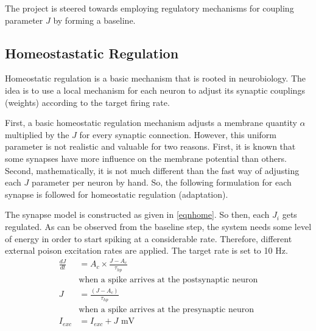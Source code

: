 \documentclass[a4paper,12pt]{article}
\begin{document}
The project is steered towards employing regulatory mechanisms for coupling parameter $J$ by forming a baseline.


\subsection{Homeostastatic Regulation}
Homeostatic regulation is a basic mechanism that is rooted in neurobiology. The idea is to use a local mechanism for each neuron to adjust its synaptic couplings (weights) according to the target firing rate. 

First, a basic homeostatic regulation mechanism adjusts a membrane quantity $\alpha$ multiplied by the $J$ for every synaptic connection. However, this uniform parameter is not realistic and valuable for two reasons. First, it is known that some synapses have more influence on the membrane potential than others. Second, mathematically, it is not much different than the fast way of adjusting each $J$ parameter per neuron by hand. So, the following formulation for each synapse is followed for homeostatic regulation (adaptation). 

The synapse model is constructed as given in \ref{eqnhome}. So then, each $J_i$ gets regulated. As can be observed from the baseline step, the system needs some level of energy in order to start spiking at a considerable rate. Therefore, different external poison excitation rates are applied. The target rate is set to 10 Hz. 
\begin{equation}
    \begin{split}
        \frac{dJ}{dt} &= A_c \times \frac{J-A_c}{\tau_{hp}} \\
        &\text{when a spike arrives at the postsynaptic neuron} \\
        J &= \frac{(J-A_c)}{\tau_{hp}} \\
        &\text{when a spike arrives at the presynaptic neuron}\\
        I_{exc} &= I_{exc} + J \text{  mV} \\
    \end{split}
    \label{eqnhome}
\end{equation}
\end{document}
